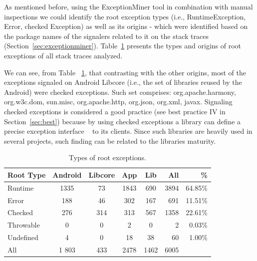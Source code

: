 \documentclass[conference]{IEEEtran}
\begin{document}
As mentioned before, using the ExceptionMiner tool in combination with manual inspections we could identify
the root exception types (i.e., RuntimeException, Error, checked Exception) as well as its origins - which were 
identified based on the package names of the signalers related to it on the stack traces (Section~\ref{sec:exceptionminer}).
Table~\ref{tab:typeroottab} presents the types and origins of root exceptions of all stack traces analyzed. 

We can see, from Table ~\ref{tab:typeroottab}, that contrasting with the other origins, most of the 
 exceptions signaled on Android Libcore (i.e., the set of libraries reused by the Android) were 
checked exceptions. Such set comprises: org.apache.harmony, org.w3c.dom, sun.misc, 
org.apache.http, org.json, org.xml, javax. Signaling checked exceptions is considered a 
good practice (see best practice IV in Section~\ref{sec:best}) because by using 
checked exceptions a library can define a precise 
exception interface ~\cite{miller1997issues} to its clients.
 Since such libraries are heavily used  in several projects, such finding can be related to the libraries maturity.


\begin{table}
\centering
\begin{tabular}{lccccrr}
    \hline
    \bfseries{Root Type} & \bfseries{Android} & \bfseries{Libcore} & \bfseries{App} & \bfseries{Lib}  & \bfseries{All} & \bfseries{\%} \\
    \hline

Runtime	&	1335	&	73	&	1843	&	690  &	3894 & 64.85\% \\  %
Error	       &	 188              &	 46	&	302             &	167	           &	691 & 11.51\%	\\
Checked	&	276           &	314	&	313          &	567	           &	1358 & 22.61\%	\\
Throwable	&	0	       &	0	&	2            &	0         &	2 & 0.03\%	\\
Undefined	&	4	&	0	&	18		&	38	   &	60	& 1.00\% \\
 \hline
All		& 1  803	&	433	&	2478	&	1462	&	6005 	\\
    \hline
  \end{tabular}
\caption{Types of root exceptions.}
  \label{tab:typeroottab}
\end{table}
\end{document}
